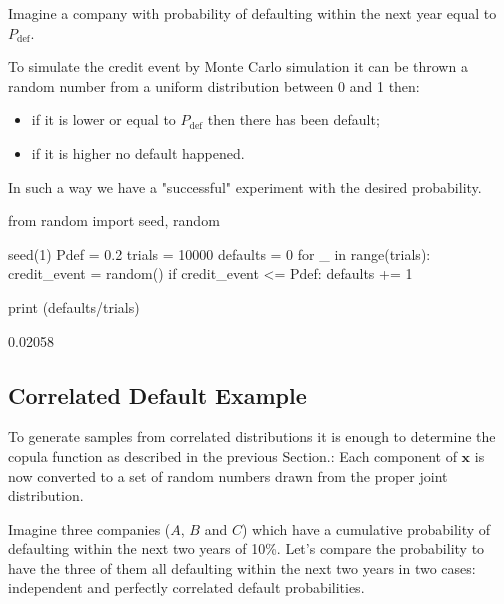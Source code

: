 Imagine a company with probability of defaulting within the next year equal to $P_{\mathrm{def}}$.

To simulate the credit event by Monte Carlo simulation it can be thrown a random number from a uniform distribution between 0 and 1  then:
\begin{itemize}
\item if it is lower or equal to $P_{\mathrm{def}}$ then there has been default;
\item if it is higher no default happened.
\end{itemize}

In such a way we have a "successful" experiment with the desired probability.

\begin{ipython}
from random import seed, random

seed(1)
Pdef = 0.2
trials = 10000
defaults = 0
for _ in range(trials):
    credit_event = random()
    if credit_event <= Pdef:
        defaults += 1

print (defaults/trials)
\end{ipython}
\begin{ioutput}
0.02058
\end{ioutput}

\subsection{Correlated Default Example}

To generate samples from correlated distributions it is enough to determine the copula function as described in the previous Section.:
Each component of $\mathbf{x}$ is now converted to a set of random numbers drawn from the proper joint distribution.


Imagine three companies ($A$, $B$ and $C$) which have a cumulative probability of defaulting within the next two years of 10\%.
Let's compare the probability to have the three of them all defaulting within the next two years in two cases: independent and perfectly correlated default probabilities.

